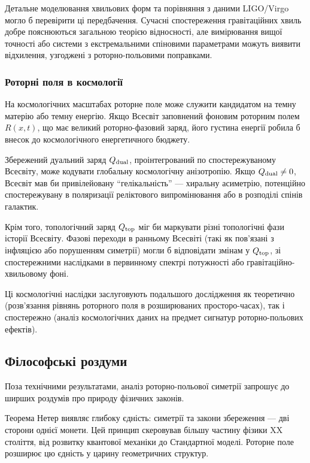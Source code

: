 \documentclass[11pt,a4paper]{article}
\numberwithin{equation}{section}
\theoremstyle{plain}
\theoremstyle{definition}
\theoremstyle{remark}
\begin{document}
Детальне моделювання хвильових форм та порівняння з даними LIGO/Virgo могло б перевірити ці передбачення. Сучасні спостереження гравітаційних хвиль добре пояснюються загальною теорією відносності, але вимірювання вищої точності або системи з екстремальними спіновими параметрами можуть виявити відхилення, узгоджені з роторно-польовими поправками.

\subsubsection{Роторні поля в космології}

На космологічних масштабах роторне поле може служити кандидатом на темну матерію або темну енергію. Якщо Всесвіт заповнений фоновим роторним полем $R(x,t)$, що має великий роторно-фазовий заряд, його густина енергії робила б внесок до космологічного енергетичного бюджету.

Збережений дуальний заряд $Q_{\rm dual}$, проінтегрований по спостережуваному Всесвіту, може кодувати глобальну космологічну анізотропію. Якщо $Q_{\rm dual} \neq 0$, Всесвіт мав би привілейовану ``гелікальність'' — хиральну асиметрію, потенційно спостережувану в поляризації реліктового випромінювання або в розподілі спінів галактик.

Крім того, топологічний заряд $Q_{\rm top}$ міг би маркувати різні топологічні фази історії Всесвіту. Фазові переходи в ранньому Всесвіті (такі як пов'язані з інфляцією або порушенням симетрії) могли б відповідати змінам у $Q_{\rm top}$, зі спостережними наслідками в первинному спектрі потужності або гравітаційно-хвильовому фоні.

Ці космологічні наслідки заслуговують подальшого дослідження як теоретично (розв'язання рівнянь роторного поля в розширюваних просторо-часах), так і спостережно (аналіз космологічних даних на предмет сигнатур роторно-польових ефектів).

\subsection{Філософські роздуми}

Поза технічними результатами, аналіз роторно-польової симетрії запрошує до ширших роздумів про природу фізичних законів.

Теорема Нетер виявляє глибоку єдність: симетрії та закони збереження — дві сторони однієї монети. Цей принцип скеровував більшу частину фізики XX століття, від розвитку квантової механіки до Стандартної моделі. Роторне поле розширює цю єдність у царину геометричних структур.
\end{document}
